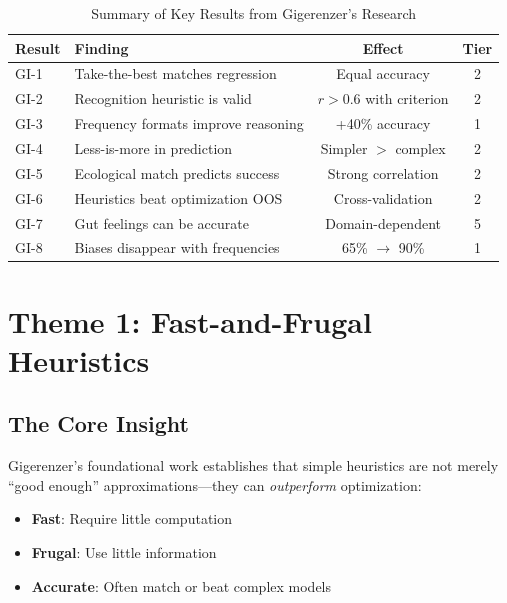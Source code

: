 \begin{table}[htbp]
\centering
\caption{Summary of Key Results from Gigerenzer's Research}
\label{tab:gi-key-results}
\renewcommand{\arraystretch}{1.3}
\begin{tabular}{@{}llcc@{}}
\toprule
\textbf{Result} & \textbf{Finding} & \textbf{Effect} & \textbf{Tier} \\
\midrule
GI-1 & Take-the-best matches regression & Equal accuracy & 2 \\
GI-2 & Recognition heuristic is valid & $r > 0.6$ with criterion & 2 \\
GI-3 & Frequency formats improve reasoning & +40\% accuracy & 1 \\
GI-4 & Less-is-more in prediction & Simpler $>$ complex & 2 \\
GI-5 & Ecological match predicts success & Strong correlation & 2 \\
GI-6 & Heuristics beat optimization OOS & Cross-validation & 2 \\
GI-7 & Gut feelings can be accurate & Domain-dependent & 5 \\
GI-8 & Biases disappear with frequencies & 65\% $\to$ 90\% & 1 \\
\bottomrule
\end{tabular}
\end{table}


\section{Theme 1: Fast-and-Frugal Heuristics}
\label{sec:gi-heuristics}

\subsection{The Core Insight}

Gigerenzer's foundational work \citep{PAP-gigerenzer1999simple} establishes that simple heuristics are not merely ``good enough'' approximations---they can \textit{outperform} optimization:

\begin{itemize}[nosep]
\item \textbf{Fast}: Require little computation
\item \textbf{Frugal}: Use little information
\item \textbf{Accurate}: Often match or beat complex models
\end{itemize}

